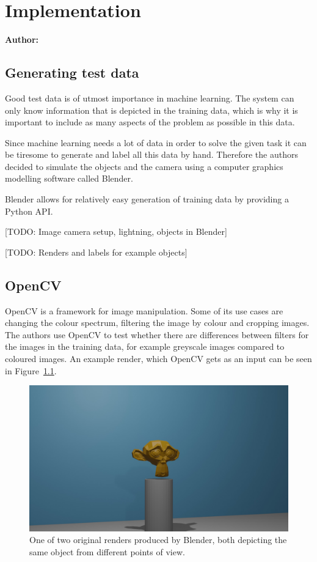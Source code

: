 \chapter{Implementation}

\textbf{Author: } 

\section{Generating test data}
Good test data is of utmost importance in machine learning. The system can only know information that is depicted in the training data, which is why it is important to include as many aspects of the problem as possible in this data.

Since machine learning needs a lot of data in order to solve the given task it can be tiresome to generate and label all this data by hand. Therefore the authors decided to simulate the objects and the camera using a computer graphics modelling software called Blender.

Blender allows for relatively easy generation of training data by providing a Python API.

[TODO: Image camera setup, lightning, objects in Blender]

[TODO: Renders and labels for example objects]

\section{OpenCV}
OpenCV is a framework for image manipulation. Some of its use cases are changing the colour spectrum, filtering the image by colour and cropping images. The authors use OpenCV to test whether there are differences between filters for the images in the training data, for example greyscale images compared to coloured images. An example render, which OpenCV gets as an input can be seen in Figure~\ref{pic:implementation_opencv_original}.

\begin{figure}[h!]
	\centering
	\includegraphics[width=5in]{img/implementation_opencv_original.png}
	\caption{One of two original renders produced by Blender, both depicting the same object from different points of view.}	%
	\label{pic:implementation_opencv_original}
\end{figure}

